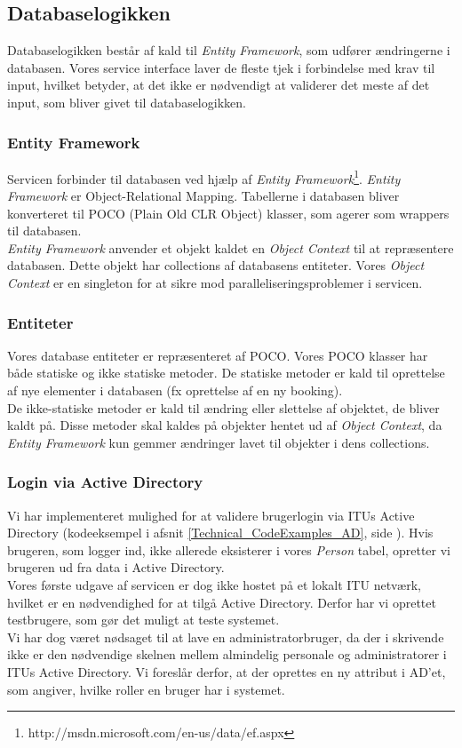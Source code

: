 \subsection{Databaselogikken}
\label{Technical_Service_logic}
Databaselogikken består af kald til \textit{Entity Framework}, som udfører ændringerne i databasen. Vores service interface laver de fleste tjek i forbindelse med krav til input, hvilket betyder, at det ikke er nødvendigt at validerer det meste af det input, som bliver givet til databaselogikken.

\subsubsection{Entity Framework}
\label{Technical_Service_logic_EF}
Servicen forbinder til databasen ved hjælp af \textit{Entity Framework}\footnote{http://msdn.microsoft.com/en-us/data/ef.aspx}. \textit{Entity Framework} er Object-Relational Mapping. Tabellerne i databasen bliver konverteret til POCO (Plain Old CLR Object) klasser, som agerer som wrappers til databasen.
\\\textit{Entity Framework} anvender et objekt kaldet en \textit{Object Context} til at repræsentere databasen. Dette objekt har collections af databasens entiteter. Vores \textit{Object Context} er en singleton for at sikre mod paralleliseringsproblemer i servicen.

\subsubsection{Entiteter}
\label{Technical_Service_logic_Entities}
Vores database entiteter er repræsenteret af POCO. Vores POCO klasser har både statiske og ikke statiske metoder. De statiske metoder er kald til oprettelse af nye elementer i databasen (fx oprettelse af en ny booking). 
\\De ikke-statiske metoder er kald til ændring eller slettelse af objektet, de bliver kaldt på. Disse metoder skal kaldes på objekter hentet ud af \textit{Object Context}, da \textit{Entity Framework} kun gemmer ændringer lavet til objekter i dens collections.

\subsubsection{Login via Active Directory}
\label{Technical_Service_logic_Login}
Vi har implementeret mulighed for at validere brugerlogin via ITUs Active Directory (kodeeksempel i afsnit \ref{Technical_CodeExamples_AD}, side \pageref{Technical_CodeExamples_AD}). Hvis brugeren, som logger ind, ikke allerede eksisterer i vores \textit{Person} tabel, opretter vi brugeren ud fra data i Active Directory.
\\Vores første udgave af servicen er dog ikke hostet på et lokalt ITU netværk, hvilket er en nødvendighed for at tilgå Active Directory. Derfor har vi oprettet testbrugere, som gør det muligt at teste systemet.
\\Vi har dog været nødsaget til at lave en administratorbruger, da der i skrivende ikke er den nødvendige skelnen mellem almindelig personale og administratorer i ITUs Active Directory. Vi foreslår derfor, at der oprettes en ny attribut i AD'et, som angiver, hvilke roller en bruger har i systemet.